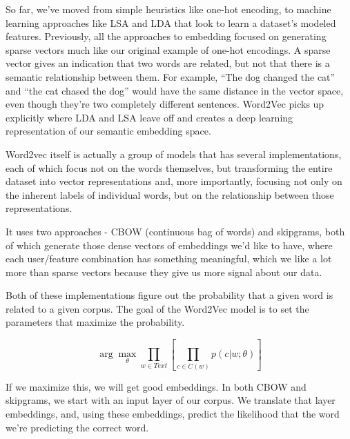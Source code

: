 \documentclass[draft, 11pt]{diazessay} %
\begin{document}
So far, we've moved from simple heuristics like one-hot encoding, to machine learning approaches like LSA and LDA that look to learn a dataset's modeled features.  Previously, all the approaches to embedding focused on generating sparse vectors much like our original example of one-hot encodings. A sparse vector gives an indication that two words are related, but not that there is a semantic relationship between them. For example, “The dog changed the cat” and “the cat chased the dog” would have the same distance in the vector space, even though they’re two completely different sentences. Word2Vec picks up explicitly where LDA and LSA leave off and creates a deep learning representation of our semantic embedding space. 

Word2vec itself is actually a group of models that has several implementations, each of which focus not on the words themselves, but transforming the entire dataset into vector representations and, more importantly, focusing  not only on the inherent labels of individual words, but on the relationship between those representations. 
  
It uses two approaches - CBOW (continuous bag of words) and skipgrams, both of which generate those dense vectors of embeddings we'd like to have, where each user/feature combination has something meaningful, which we like a lot more than sparse vectors because they give us more signal about our data. 
 
Both of these implementations figure out the probability that a given word is related to a given corpus. The goal of the Word2Vec model is to set the parameters that maximize the probability\citep{goldberg2014word2vec}. 

\begin{equation}
\arg\max_\theta \prod_{w\in Text}\left[\prod_{c \in C(w)} p(c|w;\theta)\right]
\end{equation}

If we maximize this, we will get good embeddings. In both CBOW and skipgrams, we start with  an input layer of our corpus. We translate that layer embeddings, and, using these embeddings, predict the likelihood that the word we're predicting the correct word. 
 
\def\layersep{2.5cm}
\end{document}
